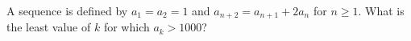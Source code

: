 A sequence is defined by $a_1=a_2=1$ and $a_{n+2}=a_{n+1}+2a_n$ for $n\ge1$. What is the least value of $k$ for which $a_k>1000$?
